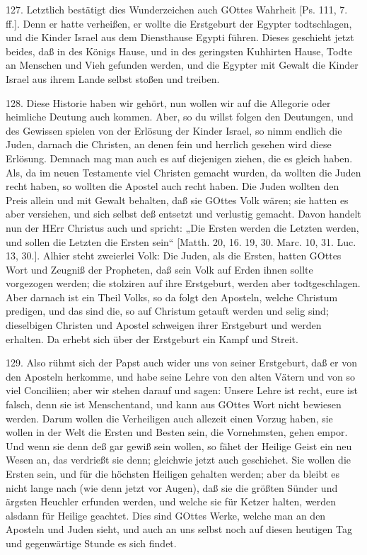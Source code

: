 127. Letztlich bestätigt dies Wunderzeichen auch GOttes Wahrheit [Ps. 111, 7. ff.]. Denn er hatte verheißen, er wollte die Erstgeburt der Egypter todtschlagen, und die Kinder Israel aus dem Diensthause Egypti führen. Dieses geschieht jetzt beides, daß in des Königs Hause, und in des geringsten Kuhhirten Hause, Todte an Menschen und Vieh gefunden werden, und die Egypter mit Gewalt die Kinder Israel aus ihrem Lande selbst stoßen und treiben.

128. Diese Historie haben wir gehört, nun wollen wir auf die Allegorie oder heimliche Deutung auch kommen. Aber, so du willst folgen den Deutungen, und des Gewissen spielen von der Erlösung der Kinder Israel, so nimm endlich die Juden, darnach die Christen, an denen fein und herrlich gesehen wird diese Erlösung. Demnach mag man auch es auf diejenigen ziehen, die es gleich haben. Als, da im neuen Testamente viel Christen gemacht wurden, da wollten die Juden recht haben, so wollten die Apostel auch recht haben. Die Juden wollten den Preis allein und mit Gewalt behalten, daß sie GOttes Volk wären; sie hatten es aber versiehen, und sich selbst deß entsetzt und verlustig gemacht. Davon handelt nun der HErr Christus auch und spricht: „Die Ersten werden die Letzten werden, und sollen die Letzten die Ersten sein“ [Matth. 20, 16. 19, 30. Marc. 10, 31. Luc. 13, 30.]. Alhier steht zweierlei Volk: Die Juden, als die Ersten, hatten GOttes Wort und Zeugniß der Propheten, daß sein Volk auf Erden ihnen sollte vorgezogen werden; die stolziren auf ihre Erstgeburt, werden aber todtgeschlagen. Aber darnach ist ein Theil Volks, so da folgt den Aposteln, welche Christum predigen, und das sind die, so auf Christum getauft werden und selig sind; dieselbigen Christen und Apostel schweigen ihrer Erstgeburt und werden erhalten. Da erhebt sich über der Erstgeburt ein Kampf und Streit.

129. Also rühmt sich der Papst auch wider uns von seiner Erstgeburt, daß er von den Aposteln herkomme, und habe seine Lehre von den alten Vätern und von so viel Conciliien; aber wir stehen darauf und sagen: Unsere Lehre ist recht, eure ist falsch, denn sie ist Menschentand, und kann aus GOttes Wort nicht bewiesen werden. Darum wollen die Verheiligen auch allezeit einen Vorzug haben, sie wollen in der Welt die Ersten und Besten sein, die Vornehmsten, gehen empor. Und wenn sie denn deß gar gewiß sein wollen, so fähet der Heilige Geist ein neu Wesen an, das verdrießt sie denn; gleichwie jetzt auch geschiehet. Sie wollen die Ersten sein, und für die höchsten Heiligen gehalten werden; aber da bleibt es nicht lange nach (wie denn jetzt vor Augen), daß sie die größten Sünder und ärgsten Heuchler erfunden werden, und welche sie für Ketzer halten, werden alsdann für Heilige geachtet. Dies sind GOttes Werke, welche man an den Aposteln und Juden sieht, und auch an uns selbst noch auf diesen heutigen Tag und gegenwärtige Stunde es sich findet.

